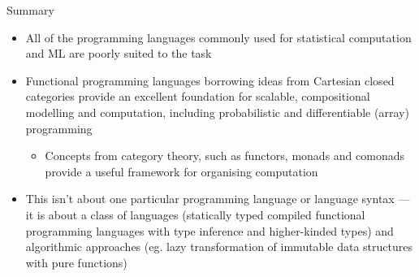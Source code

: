 \documentclass[mathserif,handout]{beamer}
\begin{document}


\begin{frame}{Summary}
\protect\hypertarget{summary}{}

\begin{itemize}

\item
  All of the programming languages commonly used for statistical
  computation and ML are poorly suited to the task
\item
  Functional programming languages borrowing ideas from \alert{Cartesian
  closed categories} provide an excellent foundation for scalable, compositional
  modelling and computation, including probabilistic and differentiable (array) programming
  \begin{itemize}
  
  \item
    Concepts from category theory, such as \alert{functors},
    \alert{monads} and \alert{comonads} provide a useful framework for
    organising computation
  \end{itemize}
\item
  This isn't about one particular programming language or language syntax --- it is about a class of
  languages (statically typed compiled functional programming languages with type
    inference and higher-kinded types) and algorithmic approaches (eg. lazy transformation of immutable data structures with pure functions)
\end{itemize}

\end{frame}

\end{document}
